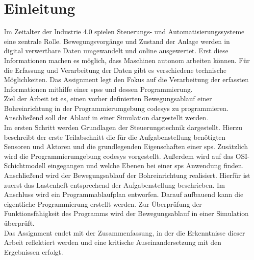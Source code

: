 \section{Einleitung}
Im Zeitalter der Industrie 4.0 spielen Steuerungs- und Automatisierungssysteme eine zentrale Rolle. Bewegungsvorgänge und Zustand der Anlage werden in digital verwertbare Daten umgewandelt und online ausgewertet. Erst diese Informationen machen es möglich, dass Maschinen autonom arbeiten können. Für die Erfassung  und Verarbeitung der Daten gibt es verschiedene technische Möglichkeiten. \autocite[vgl.][24]{Seitz2021} Das Assign\-ment legt den Fokus auf die Verarbeitung der erfassten Informationen mithilfe einer \acp{sps} und dessen Programmierung. \\
Ziel der Arbeit ist es, einen vorher definierten Bewegungsablauf einer Bohreinrichtung in der Programmierumgebung \ac{codesys} zu programmieren. Anschließend soll der Ablauf in einer Simulation dargestellt werden. \\
Im ersten Schritt werden Grundlagen der Steuerungstechnik dargestellt. Hierzu beschreibt der erste Teilabschnitt die für die Aufgabenstellung benötigten Sensoren und Aktoren und die grundlegenden Eigenschaften einer \ac{sps}. Zusätzlich wird die Programmierumgebung \ac{codesys} vorgestellt. Außerdem wird auf das OSI-Schichtmodell eingegangen und welche Ebenen bei einer \ac{sps} Anwendung finden. \\
Anschließend wird der Bewegungsablauf der Bohreinrichtung realisiert. Hierfür ist zuerst das Lastenheft entsprechend der Aufgabenstellung beschrieben. Im Anschluss wird ein Programmablaufplan entworfen. Darauf aufbauend kann die eigentliche Programmierung erstellt werden. Zur Überprüfung der Funktionsfähigkeit des Programms wird der Bewegungsablauf in einer Simulation überprüft. \\
Das Assignment endet mit der Zusammenfassung, in der die Erkenntnisse dieser Arbeit reflektiert werden und eine kritische Auseinandersetzung mit den Ergebnissen erfolgt. 





